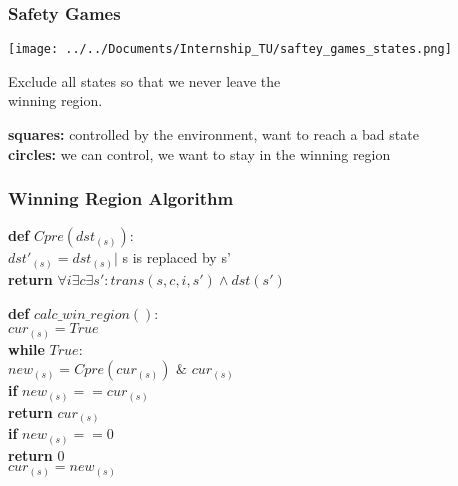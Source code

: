 \documentclass{beamer}
\begin{document}
\begin{frame}
\frametitle{Safety Games}


\noindent\begin{minipage}{0.3\textwidth}%
\texttt{[image: ../../Documents/Internship\_TU/saftey\_games\_states.png]}
\end{minipage}%
\hfill%
\begin{minipage}{0.4\textwidth}\raggedleft
Exclude all states so that 
we never leave the \\winning region.
\end{minipage}

\bigskip
\bigskip

\textbf{squares:} controlled by the environment, want to reach a bad state\\ 
\textbf{circles:} we can control, we want to stay in the winning region \\

\end{frame}

\begin{frame}
\frametitle{Winning Region Algorithm}

\textbf{def} $Cpre(dst_{(s)}):$ \\
\noindent\hspace*{6mm} $dst'_{(s)} = dst_{(s)}|$ s is replaced by s'\\
\noindent\hspace*{6mm} \textbf{return} $\forall i \exists c \exists s': trans( s, c, i, s' ) \wedge dst(s')$\\

\bigskip

\textbf{def} $calc\_win\_region(): $\\
\noindent\hspace*{6mm} $cur_{(s)} = True$ \\
\noindent\hspace*{6mm} \textbf{while} $True:$ \\
\noindent\hspace*{12mm} $new_{(s)} = Cpre(cur_{(s)})$ \& $cur_{(s)} $ \\
\noindent\hspace*{12mm} \textbf{if} $ new_{(s)} == cur_{(s)}$ \\
\noindent\hspace*{18mm} \textbf{return} $cur_{(s)}$\\
\noindent\hspace*{12mm} \textbf{if} $ new_{(s)} == 0$ \\
\noindent\hspace*{18mm} \textbf{return} $0$\\
\noindent\hspace*{12mm} $cur_{(s)} = new_{(s)}$

\end{frame}
\end{document}
